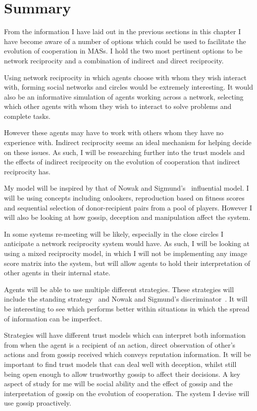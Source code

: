 \documentclass[]{final_report}
\begin{document}
\section{Summary}
From the information I have laid out in the previous sections in this chapter I have become aware of a number of options which could be used to facilitate the evolution of cooperation in MASs. I hold the two most pertinent options to be network reciprocity and a combination of indirect and direct reciprocity.\par
Using network reciprocity in which agents choose with whom they wish interact with, forming social networks and circles would be extremely interesting. It would also be an informative simulation of agents working across a network, selecting which other agents with whom they wish to interact to solve problems and complete tasks.\par
However these agents may have to work with others whom they have no experience with. Indirect reciprocity seems an ideal mechanism for helping decide on these issues. As such, I will be researching further into the trust models and the effects of indirect reciprocity on the evolution of cooperation that indirect reciprocity has.\par
My model will be inspired by that of Nowak and Sigmund's~\cite{evol_indirect_image} influential model. I will be using concepts including onlookers, reproduction based on fitness scores and sequential selection of donor-recipient pairs from a pool of players. However I will also be looking at how gossip, deception and manipulation affect the system.\par
In some systems re-meeting will be likely, especially in the close circles I anticipate a network reciprocity system would have. As such, I will be looking at using a mixed reciprocity model, in which I will not be implementing any image score matrix into the system, but will allow agents to hold their interpretation of other agents in their internal state.\par
Agents will be able to use multiple different strategies. These strategies will include the standing strategy~\cite{sugden2004economics} and Nowak and Sigmund's discriminator~\cite{evol_indirect_image}. It will be interesting to see which performs better within situations in which the spread of information can be imperfect.\par
Strategies will have different trust models which can interpret both information from when the agent is a recipient of an action, direct observation of other's actions and from gossip received which conveys reputation information. It will be important to find trust models that can deal well with deception, whilst still being open enough to allow trustworthy gossip to affect their decisions. A key aspect of study for me will be social ability and the effect of gossip and the interpretation of gossip on the evolution of cooperation. The system I devise will use gossip proactively.\par
\end{document}
